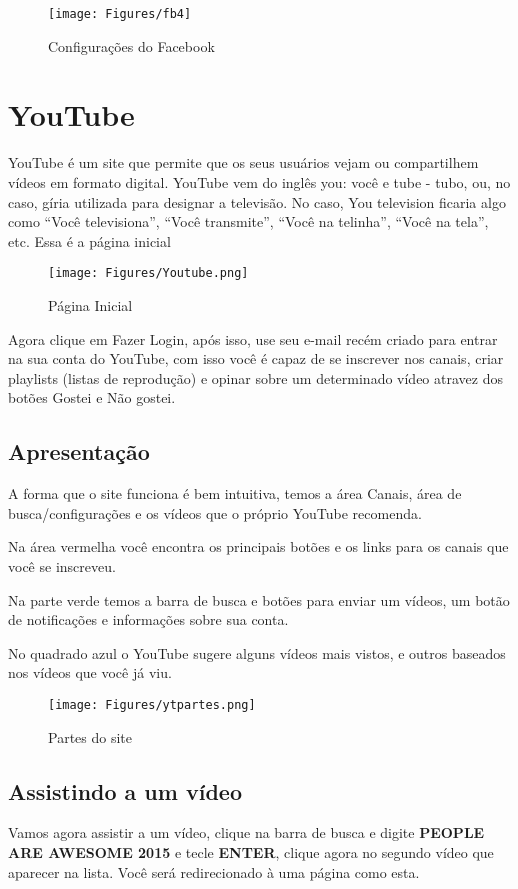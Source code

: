 \documentclass[hidelinks,12pt]{article}
\begin{document}
\begin{figure}[!h]
	\centering
	\texttt{[image: Figures/fb4]}
	\label{fig:config}
	\caption{Configurações do Facebook}
\end{figure}
	
\section{YouTube}

YouTube é um site que permite que os seus usuários vejam ou compartilhem vídeos em formato digital. YouTube vem do inglês you: você e tube - tubo, ou, no caso, gíria utilizada para designar a televisão. No caso, You television ficaria algo como ``Você televisiona'', ``Você transmite'', ``Você na telinha'', ``Você na tela'', etc. Essa é a página inicial

\begin{figure}[!h]
	\centering
	\texttt{[image: Figures/Youtube.png]}
	\label{fig:config}
	\caption{Página Inicial}
\end{figure}

Agora clique em Fazer Login, após isso, use seu e-mail recém criado para entrar na sua conta do YouTube, com isso você é capaz de se inscrever nos canais, criar playlists (listas de reprodução) e opinar sobre um determinado vídeo atravez dos botões Gostei e Não gostei.


\subsection{Apresentação}
A forma que o site funciona é bem intuitiva, temos a área Canais, área de busca/configurações e os vídeos que o próprio YouTube recomenda.

Na área vermelha você encontra os principais botões e os links para os canais que você se inscreveu.

Na parte verde temos a barra de busca e botões para enviar um vídeos, um botão de notificações e informações sobre sua conta.

No quadrado azul o YouTube sugere alguns vídeos mais vistos, e outros baseados nos vídeos que você já viu.

\begin{figure}[!h]
	\centering
	\texttt{[image: Figures/ytpartes.png]}
	\label{fig:config}
	\caption{Partes do site}
\end{figure}


\subsection{Assistindo a um vídeo}
Vamos agora assistir a um vídeo, clique na barra de busca e digite \textbf{PEOPLE ARE AWESOME 2015} e tecle \textbf{ENTER}, clique agora no segundo vídeo que aparecer na lista.	Você será redirecionado à uma página como esta.
\end{document}
